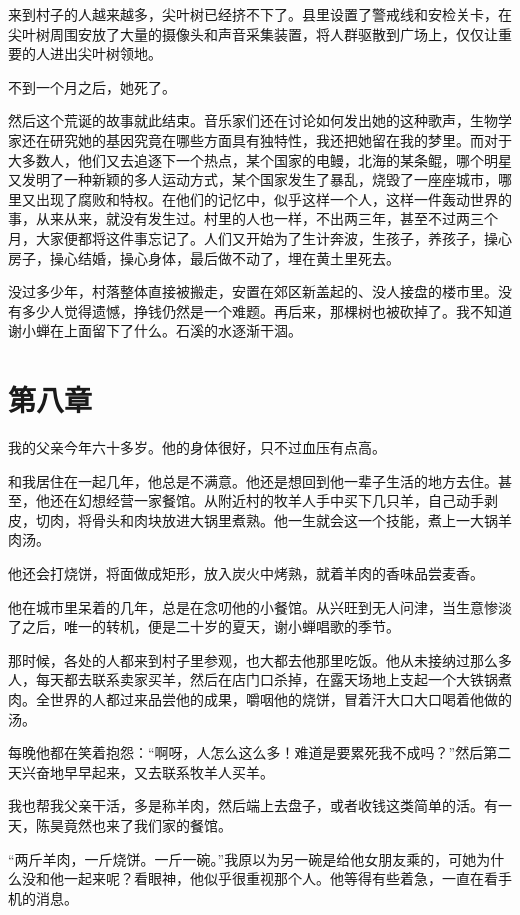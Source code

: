 \documentclass[lang=cn]{elegantpaper}
\begin{document}
来到村子的人越来越多，尖叶树已经挤不下了。县里设置了警戒线和安检关卡，在尖叶树周围安放了大量的摄像头和声音采集装置，将人群驱散到广场上，仅仅让重要的人进出尖叶树领地。

不到一个月之后，她死了。

然后这个荒诞的故事就此结束。音乐家们还在讨论如何发出她的这种歌声，生物学家还在研究她的基因究竟在哪些方面具有独特性，我还把她留在我的梦里。而对于大多数人，他们又去追逐下一个热点，某个国家的电鳗，北海的某条鲲，哪个明星又发明了一种新颖的多人运动方式，某个国家发生了暴乱，烧毁了一座座城市，哪里又出现了腐败和特权。在他们的记忆中，似乎这样一个人，这样一件轰动世界的事，从来从来，就没有发生过。村里的人也一样，不出两三年，甚至不过两三个月，大家便都将这件事忘记了。人们又开始为了生计奔波，生孩子，养孩子，操心房子，操心结婚，操心身体，最后做不动了，埋在黄土里死去。

没过多少年，村落整体直接被搬走，安置在郊区新盖起的、没人接盘的楼市里。没有多少人觉得遗憾，挣钱仍然是一个难题。再后来，那棵树也被砍掉了。我不知道谢小蝉在上面留下了什么。石溪的水逐渐干涸。 

\section{第八章}
\label{sec:org45c4814}

我的父亲今年六十多岁。他的身体很好，只不过血压有点高。

和我居住在一起几年，他总是不满意。他还是想回到他一辈子生活的地方去住。甚至，他还在幻想经营一家餐馆。从附近村的牧羊人手中买下几只羊，自己动手剥皮，切肉，将骨头和肉块放进大锅里煮熟。他一生就会这一个技能，煮上一大锅羊肉汤。

他还会打烧饼，将面做成矩形，放入炭火中烤熟，就着羊肉的香味品尝麦香。

他在城市里呆着的几年，总是在念叨他的小餐馆。从兴旺到无人问津，当生意惨淡了之后，唯一的转机，便是二十岁的夏天，谢小蝉唱歌的季节。

那时候，各处的人都来到村子里参观，也大都去他那里吃饭。他从未接纳过那么多人，每天都去联系卖家买羊，然后在店门口杀掉，在露天场地上支起一个大铁锅煮肉。全世界的人都过来品尝他的成果，嚼咽他的烧饼，冒着汗大口大口喝着他做的汤。

每晚他都在笑着抱怨：“啊呀，人怎么这么多！难道是要累死我不成吗？”然后第二天兴奋地早早起来，又去联系牧羊人买羊。

我也帮我父亲干活，多是称羊肉，然后端上去盘子，或者收钱这类简单的活。有一天，陈昊竟然也来了我们家的餐馆。

“两斤羊肉，一斤烧饼。一斤一碗。”我原以为另一碗是给他女朋友乘的，可她为什么没和他一起来呢？看眼神，他似乎很重视那个人。他等得有些着急，一直在看手机的消息。
\end{document}
